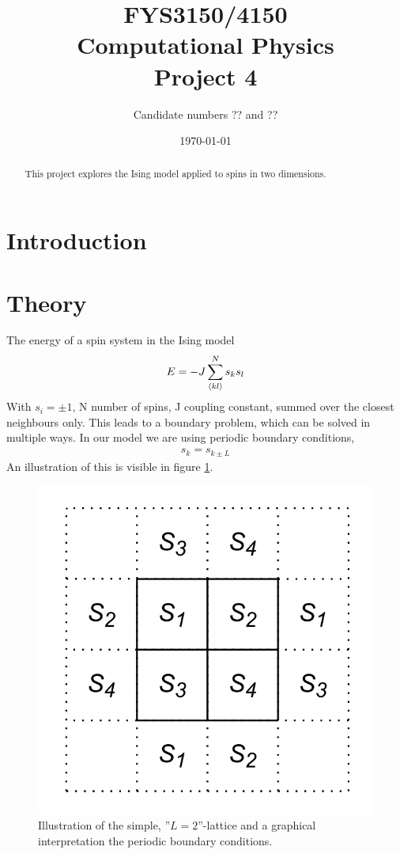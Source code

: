 \documentclass[11pt,a4paper,english]{article}
\title{FYS3150/4150\\Computational Physics\\Project 4}
\author{Candidate numbers ?? and ??}
\date{\today}
\numberwithin{equation}{section}
\begin{document}
\maketitle

\begin{abstract}
This project explores the Ising model applied to spins in two dimensions.
\end{abstract}



\section{Introduction}


\section{Theory}

The energy of a spin system in the Ising model 
\begin{gather}
E = -J\sum_{\expval{kl}}^N s_k s_l
\end{gather}
With $s_i = \pm 1$, N number of spins, J coupling constant, summed over 
the closest neighbours only. This leads to a boundary problem, which 
can be solved in multiple ways. In our model we are 
using periodic boundary conditions,
\begin{gather}
s_k = s_{k \pm L}
\label{eq:boundary}
\end{gather}
An illustration of this is visible in figure \ref{fig:spin_neighbours}.

\begin{figure}[H]
\centering
\includegraphics[scale=0.15]{pics/simple_lattice.png}
\caption{ Illustration of the simple, ''$L=2$''-lattice and a graphical interpretation the periodic boundary conditions.}
\label{fig:spin_neighbours}
\end{figure}
\end{document}
